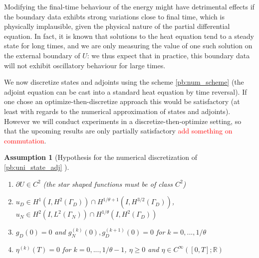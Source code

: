 \documentclass[english,a4paper,10pt,oneside]{scrbook}	%
\theoremstyle{break}
\newtheorem{ass}[equation]{Assumption}
\theoremstyle{remark}
\newcommand{\mR}{\mathbb{R}}
\begin{document}
Modifying the final-time behaviour of the energy might have detrimental effects if the boundary data exhibts strong variations close to final time, which is physically implausible, given the physical nature of the partial differential equation. In fact, it is known that solutions to the heat equation tend to a steady state for long times, and we are only measuring the value of one such solution on the external boundary of $U$: we thus expect that in practice, this boundary data will not exhibit oscillatory behaviour for large times.

We now discretize states and adjoints using the scheme \cref{pb:num_scheme} (the adjoint equation can be cast into a standard heat equation by time reversal). If one chose an optimize-then-discretize approach this would be satisfactory (at least with regards to the numerical approximation of states and adjoints). However we will conduct experiments in a discretize-then-optimize setting, so that the upcoming results are only partially satisfactory \textcolor{red}{add something on commutation}.

\begin{ass}[Hypothesis for the numerical discretization of \cref{pb:uni_state_adj} ]
\label{ass:num_discr_shopt}
\textcolor{white}{ }
\begin{enumerate}
	\item $\partial U \in C^2$ (the star shaped functions must be of class $C^2$)
	\item $u_D \in H^1(I, H^{2}(\Gamma_D)) \cap H^{1/\theta+1}(I,H^{3/2}(\Gamma_D))$, $u_N \in H^2(I,L^2(\Gamma_N)) \cap H^{1/\theta}(I, H^2(\Gamma_D))$
	\item $g_D(0)=0$ and $g_N^{(k)}(0), g_D^{(k+1)}(0)  = 0$ for $k=0,..., 1/\theta$
	\item $\eta^{(k)}(T)  = 0$ for $k=0,..., 1/\theta-1$, $\eta \geq 0$ and $\eta \in C^{\infty}([0,T];\mR)$
\end{enumerate}

\end{ass}
\end{document}
